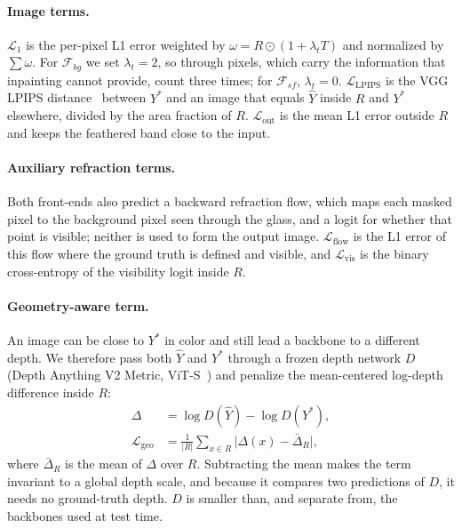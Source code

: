 \paragraph{Image terms.}
$\mathcal{L}_{1}$ is the per-pixel L1 error weighted by $\omega = R \odot (1 + \lambda_t T)$ and normalized by $\sum \omega$.
For $\mathcal{F}_{bg}$ we set $\lambda_t = 2$, so through pixels, which carry the information that inpainting cannot provide, count three times; for $\mathcal{F}_{sf}$, $\lambda_t = 0$.
$\mathcal{L}_{\mathrm{LPIPS}}$ is the VGG LPIPS distance~\cite{lpips} between $Y^*$ and an image that equals $\hat Y$ inside $R$ and $Y^*$ elsewhere, divided by the area fraction of $R$.
$\mathcal{L}_{\mathrm{out}}$ is the mean L1 error outside $R$ and keeps the feathered band close to the input.

\paragraph{Auxiliary refraction terms.}
Both front-ends also predict a backward refraction flow, which maps each masked pixel to the background pixel seen through the glass, and a logit for whether that point is visible; neither is used to form the output image.
$\mathcal{L}_{\mathrm{flow}}$ is the L1 error of this flow where the ground truth is defined and visible, and $\mathcal{L}_{\mathrm{vis}}$ is the binary cross-entropy of the visibility logit inside $R$.

\paragraph{Geometry-aware term.}
An image can be close to $Y^*$ in color and still lead a backbone to a different depth.
We therefore pass both $\hat Y$ and $Y^*$ through a frozen depth network $D$ (Depth Anything V2 Metric, ViT-S~\cite{dav2}) and penalize the mean-centered log-depth difference inside $R$:
\begin{equation}
  \begin{split}
  \Delta &= \log D(\hat Y) - \log D(Y^*), \\
  \mathcal{L}_{\mathrm{geo}} & = \frac{1}{|R|}\sum_{x \in R} \Big|\Delta(x) - \bar\Delta_R\Big|,
  \end{split}
  \label{eq:geo}
\end{equation}
where $\bar\Delta_R$ is the mean of $\Delta$ over $R$.
Subtracting the mean makes the term invariant to a global depth scale, and because it compares two predictions of $D$, it needs no ground-truth depth.
$D$ is smaller than, and separate from, the backbones used at test time.

